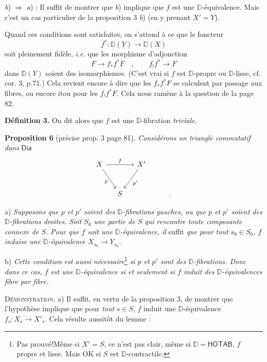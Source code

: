 \documentclass[11pt,leqno]{article}
\newcommand{\printedpage}[1]{\marginpar{\footnotesize p.~#1}}
\newcommand{\msp}[1]{\marginpar{\footnotesize [#1]}}
\newcommand{\DD}{\mathbb{D}}
\newcommand{\Dia}{\mathsf{Dia}}
\begin{document}
\textit{b}) $\Rightarrow$ \textit{a}) : Il suffit de montrer que \textit{b}) implique que $f$ est une $\DD$-équivalence. Mais c'est un cas particulier de la proposition 3 \textit{b}) (en y prenant $X' = Y$).

\msp{page 84}

Quand ces conditions sont satisfaites, on s'attend à ce que le foncteur
\[
f^* : \DD(Y) \longrightarrow \DD(X)
\]
soit pleinement fidèle, \textit{i.e.} que les morphisme d'adjonction %
\[
F \longrightarrow f_*f^*F \quad , \qquad f_!f^* \longrightarrow F %
\]
dans $\DD(Y)$ soient des isomorphismes. (C'est vrai si $f$ est $\DD$-propre ou $\DD$-lisse, cf. cor. 3, p.71.) Cela revient encore à dire que les $f_*f^*F$ se calculent par passage aux fibres, ou encore itou pour les $f_!f^*F$. Cela nous ramène à la question de la page 82.

\textbf{Définition 3.} On dit alors que $f$ est une $\DD$-fibration \textit{triviale}.

\textbf{Proposition 6} (précise prop. 3 page 81). \textit{Considérons un triangle commutatif dans} $\Dia$
\[
\begin{tikzcd}[column sep=small, row sep=large]
X \arrow[rr, "f"] \arrow[dr, "p"'] & & X' \arrow[dl, "p'"] \\
& S & & & .
\end{tikzcd}
\]

\printedpage{52}

\indent a) \textit{Supposons que $p$ et $p'$ soient des $\DD$-fibrations gauches, ou que $p$ et $p'$ soient des $\DD$-fibrations droites. Soit $S_0$ une partie de $S$ qui rencontre toute composante connexe de $S$. Pour que $f$ soit une $\DD$-équivalence, il} suffit \textit{que pour tout $s_0 \in S_0$, $f$ induise une $\DD$-équivalence $X_{s_0} \to Y_{s_0}$.}

\indent b) \textit{Cette condition est aussi nécessaire}\footnote[40]{Pas prouvé!\footnotemark[41] Même si $X' = S$, ce n'est pas clair, même si $\DD = \mathsf{HOTAB}$, $f$ propre et lisse. Mais OK si $S$ est $\DD$-contractile.} \textit{si $p$ et $p'$ sont des $\DD$-fibrations. Donc dans ce cas, $f$ est une $\DD$-équivalence si et seulement si $f$ induit des $\DD$-équivalences fibre par fibre.}

\msp{page 85}

\textsc{Démonstration.} a) Il suffit, en vertu de la proposition 3, de montrer que l'hypothèse implique que pour \textit{tout} $s \in S$, $f$ induit une $\DD$-équivalence $f_s : X_s \to X'_s$. Cela résulte aussitôt du lemme :
\end{document}
